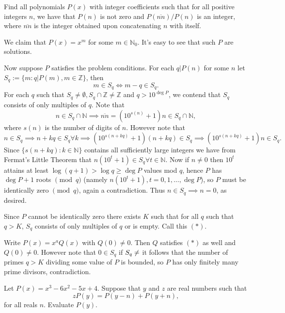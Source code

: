 \documentclass[11pt]{article}
\theoremstyle{definition}
\begin{document}
\begin{question}[name={2020-2021 San Diego Power Contest, Winter, Day 1, \href{https://artofproblemsolving.com/community/c6h2415956p19854559}{Problem 4}}]
	Find all polynomials $P(x)$ with integer coefficients such that for all positive integers $n$, we have that $P(n)$ is not zero and ${P(\overline{nn})}/{P(n)}$ is an integer, where $\overline{nn}$ is the integer obtained upon concatenating $n$ with itself.
\end{question}


\begin{solution}[name={Solution by stroller}]
	We claim that $P(x) = x^m$ for some $m \in \mathbb N_0$. It's easy to see that such $P$ are solutions.
	
	Now suppose $P$ satisfies the problem conditions. For each $q | P(n)$ for some $n$ let $S_q := \{m: q|P(m), m \in \mathbb Z\}$, then $$m \in S_q \iff m-q \in S_q.$$ For each $q$ such that $S_q \ne \emptyset, S_q \cap \mathbb Z \ne \mathbb Z$ and $q > 10^{\deg P}$, we contend that $S_q$ consists of only multiples of $q$. Note that $$n\in S_q\cap \mathbb N \implies \overline{nn} = (10^{s(n)} + 1)n \in S_q\cap \mathbb N,$$ where $s(n)$ is the number of digits of $n$. However note that $$n\in S_q \implies n + kq \in S_q \forall k  \implies (10^{s(n+kq)}+1)(n+kq) \in S_q \implies (10^{s(n+kq)}+1)n \in S_q.$$ Since $\{s(n+kq): k \in \mathbb N\}$ contains all sufficiently large integers we have from Fermat's Little Theorem that $n(10^t + 1) \in S_q \forall t \in \mathbb N$. Now if $n \ne 0$ then $10^t$ attains at least $\log(q+1) > \log q \ge \deg P$ values mod $q$, hence $P$ has $\deg P + 1$ roots $\pmod q$ (namely $n(10^t + 1), t = 0,1,\dots,\deg P$), so $P$ must be identically zero $\pmod q$, again a contradiction. Thus $n \in S_q \implies n = 0$, as desired.
	
	Since $P$ cannot be identically zero there exists $K$ such that for all $q$ such that $q > K$, $S_q$ consists of only multiples of $q$ or is empty. Call this $(*)$.
	
	Write $P(x) = x^aQ(x)$ with $Q(0) \ne 0$. Then $Q$ satisfies $(*)$ as well and $Q(0) \ne 0$. However note that $0 \in S_q$ if $S_q \ne \empty$ it follows that the number of primes $q > K$ dividing some value of $P$ is bounded, so $P$ has only finitely many prime divisors, contradiction.
\end{solution}






\begin{question}[name={2020-21 CHMMC Winter, Individual Round, \href{https://artofproblemsolving.com/community/c126h2426223p20001828}{Problem 4}}]
	Let $P(x) = x^3 - 6x^2 - 5x + 4$. Suppose that $y$ and $z$ are real numbers such that
	\[ zP(y) = P(y - n) + P(y + n), \]for all reals $n$. Evaluate $P(y)$.
\end{question}
\end{document}
